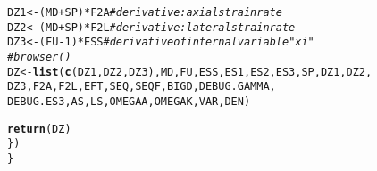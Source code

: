 \documentclass{article}\usepackage[]{graphicx}\usepackage[]{color}
\makeatletter
\newcommand{\hlnum}[1]{\textcolor[rgb]{0.686,0.059,0.569}{#1}}%
\newcommand{\hlcom}[1]{\textcolor[rgb]{0.678,0.584,0.686}{\textit{#1}}}%
\newcommand{\hlopt}[1]{\textcolor[rgb]{0,0,0}{#1}}%
\newcommand{\hlstd}[1]{\textcolor[rgb]{0.345,0.345,0.345}{#1}}%
\newcommand{\hlkwb}[1]{\textcolor[rgb]{0.69,0.353,0.396}{#1}}%
\newcommand{\hlkwd}[1]{\textcolor[rgb]{0.737,0.353,0.396}{\textbf{#1}}}%
\newenvironment{kframe}{%
 \def\at@end@of@kframe{}%
 \ifinner\ifhmode%
  \def\at@end@of@kframe{\end{minipage}}%
  \begin{minipage}{\columnwidth}%
 \fi\fi%
 \def\FrameCommand##1{\hskip\@totalleftmargin \hskip-\fboxsep
 \colorbox{shadecolor}{##1}\hskip-\fboxsep
     \hskip-\linewidth \hskip-\@totalleftmargin \hskip\columnwidth}%
 \MakeFramed {\advance\hsize-\width
   \@totalleftmargin\z@ \linewidth\hsize
   \@setminipage}}%
 {\par\unskip\endMakeFramed%
 \at@end@of@kframe}
\newenvironment{knitrout}{}{} %
\makeatother
\begin{document}
\begin{knitrout}
\begin{kframe}
\begin{alltt}
    \hlstd{DZ1} \hlkwb{<-} \hlstd{(MD} \hlopt{+} \hlstd{SP)} \hlopt{*} \hlstd{F2A} \hlcom{# derivative: axial strain rate}
    \hlstd{DZ2} \hlkwb{<-} \hlstd{(MD} \hlopt{+} \hlstd{SP)} \hlopt{*} \hlstd{F2L} \hlcom{# derivative: lateral strain rate}
    \hlstd{DZ3} \hlkwb{<-} \hlstd{(FU} \hlopt{-} \hlnum{1}\hlstd{)} \hlopt{*} \hlstd{ESS}  \hlcom{# derivative of internal variable "xi"}
    \hlcom{#     browser()}
    \hlstd{DZ} \hlkwb{<-} \hlkwd{list}\hlstd{(}\hlkwd{c}\hlstd{(DZ1, DZ2, DZ3), MD, FU, ESS, ES1, ES2, ES3, SP, DZ1, DZ2,}
               \hlstd{DZ3, F2A, F2L, EFT, SEQ, SEQF, BIGD, DEBUG.GAMMA,}
               \hlstd{DEBUG.ES3, AS, LS, OMEGAA, OMEGAK,VAR, DEN)}

    \hlkwd{return}\hlstd{(DZ)}
  \hlstd{\})}
\hlstd{\}}
\end{alltt}
\end{kframe}
\end{knitrout}
\end{document}
